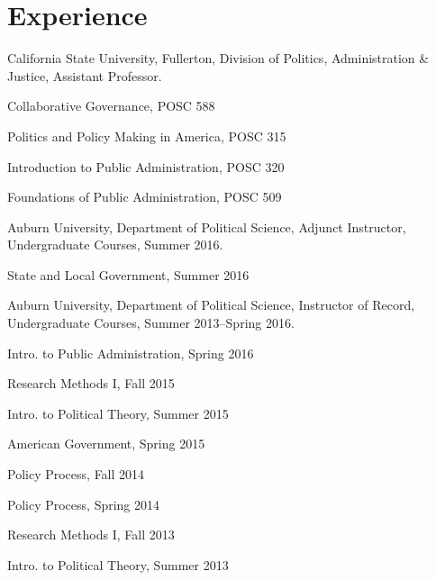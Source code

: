 \documentclass[11pt,letterpaper]{article}
\renewenvironment{itemize}{
  \begin{list}{}{
    \setlength{\leftmargin}{1.5em}
    \setlength{\itemsep}{0.25em}
    \setlength{\parskip}{0pt}
    \setlength{\parsep}{0.25em}
  }
}{
  \end{list}
}
\begin{document}
\section*{Experience}

\begin{itemize}\leftmargin=2pt\itemindent=-15pt
	
\item California State University, Fullerton, Division of Politics, Administration \& Justice, Assistant Professor.
	\begin{itemize}
		\item Collaborative Governance, POSC 588
		\item Politics and Policy Making in America, POSC 315
		\item Introduction to Public Administration, POSC 320
		\item Foundations of Public Administration, POSC 509
	\end{itemize}
	
\item Auburn University, Department of Political Science, Adjunct Instructor, Undergraduate Courses, Summer 2016.
	\begin{itemize}\leftmargin=2pt\itemindent=-15pt
		\item State and Local Government, Summer 2016
	\end{itemize}
	
\item Auburn University, Department of Political Science, Instructor of Record, Undergraduate Courses, Summer 2013--Spring 2016.
  	\begin{itemize}\leftmargin=2pt\itemindent=-15pt
			\begin{multicols}{2}
			\item Intro. to Public Administration, Spring 2016
			\item Research Methods I, Fall 2015      
			\item Intro. to Political Theory, Summer 2015
			\item American Government, Spring 2015
			\item Policy Process, Fall 2014	
			\item Policy Process, Spring 2014
			\item Research Methods I, Fall 2013
			\item Intro. to Political Theory, Summer 2013
		 	\end{multicols}				
	\end{itemize}


\end{itemize}
\end{document}

